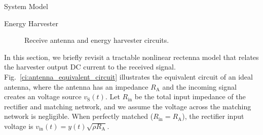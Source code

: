\documentclass[journal]{IEEEtran}
\begin{document}
\begin{section}{System Model}
		\begin{subsection}{Energy Harvester}
			\begin{figure}[!t]
				\centering
				\caption{Receive antenna and energy harvester circuits.}
			\end{figure}

			In this section, we briefly revisit a tractable nonlinear rectenna model that relates the harvester output DC current to the received signal. Fig.~\ref{ci:antenna_equivalent_circuit} illustrates the equivalent circuit of an ideal antenna, where the antenna has an impedance $R_{\mathrm{A}}$ and the incoming signal creates an voltage source $v_{\mathrm{S}}(t)$. Let $R_{\mathrm{in}}$ be the total input impedance of the rectifier and matching network, and we assume the voltage across the matching network is negligible. When perfectly matched ($R_{\mathrm{in}}=R_{\mathrm{A}}$), the rectifier input voltage is $v_{\mathrm{in}}(t)=y(t)\sqrt{\rho R_{\mathrm{A}}}$.


\end{subsection}
\end{section}
\end{document}
